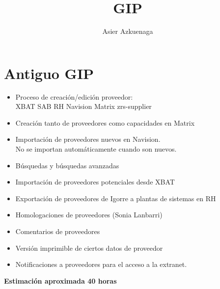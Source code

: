 \documentclass[12pt]{article}
\begin{document}
\title{GIP}
\author{Asier Azkuenaga}



\section {Antiguo GIP}
\begin{itemize}
\item Proceso de creación/edición proveedor:\\ XBAT  SAB  RH  Navision  Matrix  zrs-supplier
\item Creación tanto de proveedores como capacidades en Matrix
\item Importación de proveedores nuevos en Navision. \\
  No se importan automáticamente cuando son nuevos.
\item Búsquedas y búsquedas avanzadas
\item Importación de proveedores potenciales desde XBAT
\item Exportación de proveedores de Igorre a plantas de sistemas en RH
\item Homologaciones de proveedores (Sonia Lanbarri)
\item Comentarios de proveedores
\item Versión imprimible de ciertos datos de proveedor
\item Notificaciones a proveedores para el acceso a la extranet.
\end{itemize}
\textbf{Estimación aproximada 40 horas}
\end{document}

